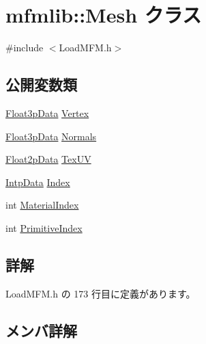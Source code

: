 \hypertarget{classmfmlib_1_1_mesh}{}\section{mfmlib\+:\+:Mesh クラス}
\label{classmfmlib_1_1_mesh}


{\ttfamily \#include $<$Load\+M\+F\+M.\+h$>$}

\subsection*{公開変数類}
\begin{DoxyCompactItemize}
\item 
\mbox{\hyperlink{classmfmlib_1_1_float3p_data}{Float3p\+Data}} \mbox{\hyperlink{classmfmlib_1_1_mesh_aa51a50ca2d51c283769d0efff0122d81}{Vertex}}
\item 
\mbox{\hyperlink{classmfmlib_1_1_float3p_data}{Float3p\+Data}} \mbox{\hyperlink{classmfmlib_1_1_mesh_acc9099d9995b1f42dedc7ad0a4320d69}{Normals}}
\item 
\mbox{\hyperlink{classmfmlib_1_1_float2p_data}{Float2p\+Data}} \mbox{\hyperlink{classmfmlib_1_1_mesh_a8cf113dcdb5f339dbe192072205d9210}{Tex\+UV}}
\item 
\mbox{\hyperlink{classmfmlib_1_1_intp_data}{Intp\+Data}} \mbox{\hyperlink{classmfmlib_1_1_mesh_aa6919522434d9867a885ddfcabb314b1}{Index}}
\item 
int \mbox{\hyperlink{classmfmlib_1_1_mesh_ad9b38a36ca097956b5b98aef018737b2}{Material\+Index}}
\item 
int \mbox{\hyperlink{classmfmlib_1_1_mesh_aae7ea245b25b22be622c58b21c4a2a06}{Primitive\+Index}}
\end{DoxyCompactItemize}


\subsection{詳解}


 Load\+M\+F\+M.\+h の 173 行目に定義があります。



\subsection{メンバ詳解}
\mbox{\label{classmfmlib_1_1_mesh_aa6919522434d9867a885ddfcabb314b1}} 
